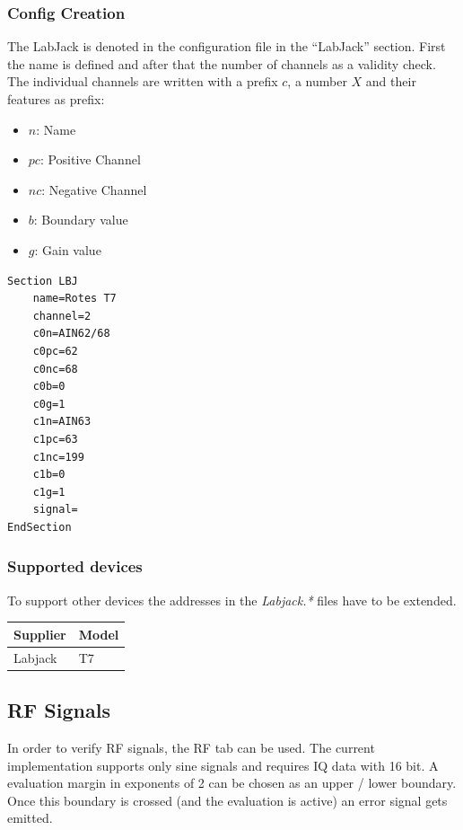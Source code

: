\documentclass[10pt,a4paper]{article}
\begin{document}
	\subsubsection{Config Creation}	
	The LabJack is denoted in the configuration file in the \enquote{LabJack} section. First the name is defined and after that the number of channels as a validity check. The individual channels are written with a prefix $c$, a number $X$ and their features as prefix:
	
	\begin{itemize}
	\item $n$: Name
	\item $pc$: Positive Channel
	\item $nc$: Negative Channel
	\item $b$: Boundary value
	\item $g$: Gain value
	\end{itemize}
	
\begin{lstlisting}[caption=LBJ Config]
Section LBJ
	name=Rotes T7
	channel=2
	c0n=AIN62/68
	c0pc=62
	c0nc=68
	c0b=0
	c0g=1
	c1n=AIN63
	c1pc=63
	c1nc=199
	c1b=0
	c1g=1
	signal=
EndSection
\end{lstlisting}
	
		\subsubsection{Supported devices}
		To support other devices the addresses in the \textit{Labjack.*} files have to be extended.
	
		\begin{table}[H]
		\centering
		\begin{tabular}{ll}
		\toprule
		Supplier			& Model \\ \midrule
		Labjack				& T7 \\
		\bottomrule
		\end{tabular}			
		\end{table}	

	\newpage
	\subsection{RF Signals}
	In order to verify RF signals, the RF tab can be used. The current implementation supports only sine signals and requires IQ data with 16 bit. A evaluation margin in exponents of 2 can be chosen as an upper / lower boundary. Once this boundary is crossed (and the evaluation is active) an error signal gets emitted.
		
\end{document}
